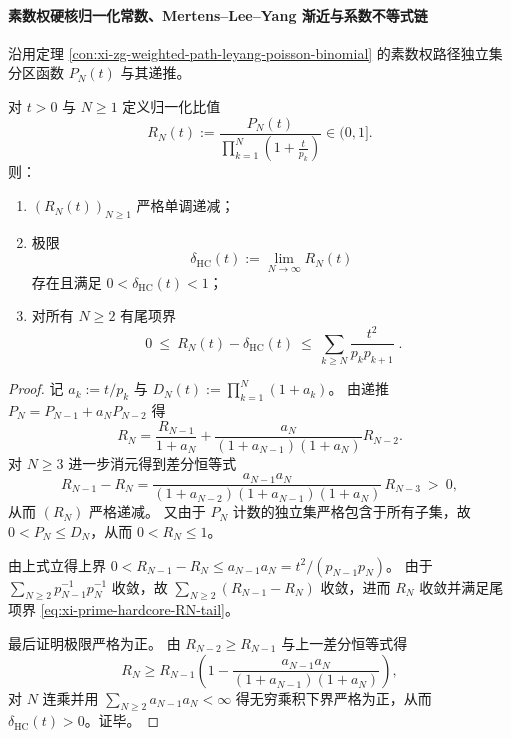 \paragraph{素数权硬核归一化常数、Mertens--Lee--Yang 渐近与系数不等式链}
沿用定理 \ref{con:xi-zg-weighted-path-leyang-poisson-binomial} 的素数权路径独立集分区函数 \(P_N(t)\) 与其递推。
\par
\begin{theorem}[硬核归一化常数的存在性与显式尾项控制]\label{thm:xi-prime-hardcore-normalization-constant}
对 \(t>0\) 与 \(N\ge 1\) 定义归一化比值
\begin{equation}\label{eq:xi-prime-hardcore-RN-def}
R_N(t)
:=
\frac{P_N(t)}{\prod_{k=1}^{N}\left(1+\frac{t}{p_k}\right)}\in(0,1].
\end{equation}
则：
\begin{enumerate}
  \item \((R_N(t))_{N\ge 1}\) 严格单调递减；
  \item 极限
  \begin{equation}\label{eq:xi-prime-hardcore-deltaHC-def}
  \boxed{\ \delta_{\mathrm{HC}}(t):=\lim_{N\to\infty}R_N(t)\ }
  \end{equation}
  存在且满足 \(0<\delta_{\mathrm{HC}}(t)<1\)；
  \item 对所有 \(N\ge 2\) 有尾项界
  \begin{equation}\label{eq:xi-prime-hardcore-RN-tail}
  \boxed{\;
  0\ \le\ R_N(t)-\delta_{\mathrm{HC}}(t)\ \le\ \sum_{k\ge N}\frac{t^2}{p_kp_{k+1}}\; }.
  \end{equation}
\end{enumerate}
\end{theorem}
\begin{proof}
记 \(a_k:=t/p_k\) 与 \(D_N(t):=\prod_{k=1}^{N}(1+a_k)\)。
由递推 \(P_N=P_{N-1}+a_NP_{N-2}\) 得
\[
R_N=\frac{R_{N-1}}{1+a_N}+\frac{a_N}{(1+a_{N-1})(1+a_N)}R_{N-2}.
\]
对 \(N\ge 3\) 进一步消元得到差分恒等式
\[
R_{N-1}-R_N
=\frac{a_{N-1}a_N}{(1+a_{N-2})(1+a_{N-1})(1+a_N)}\,R_{N-3}\ >\ 0,
\]
从而 \((R_N)\) 严格递减。
又由于 \(P_N\) 计数的独立集严格包含于所有子集，故 \(0<P_N\le D_N\)，从而 \(0<R_N\le 1\)。
\par
由上式立得上界 \(0<R_{N-1}-R_N\le a_{N-1}a_N=t^2/(p_{N-1}p_N)\)。
由于 \(\sum_{N\ge 2}p_{N-1}^{-1}p_N^{-1}\) 收敛，故 \(\sum_{N\ge 2}(R_{N-1}-R_N)\) 收敛，进而 \(R_N\) 收敛并满足尾项界 \eqref{eq:xi-prime-hardcore-RN-tail}。
\par
最后证明极限严格为正。
由 \(R_{N-2}\ge R_{N-1}\) 与上一差分恒等式得
\[
R_N
\ge R_{N-1}\left(1-\frac{a_{N-1}a_N}{(1+a_{N-1})(1+a_N)}\right),
\]
对 \(N\) 连乘并用 \(\sum_{N\ge 2}a_{N-1}a_N<\infty\) 得无穷乘积下界严格为正，从而 \(\delta_{\mathrm{HC}}(t)>0\)。证毕。
\end{proof}

